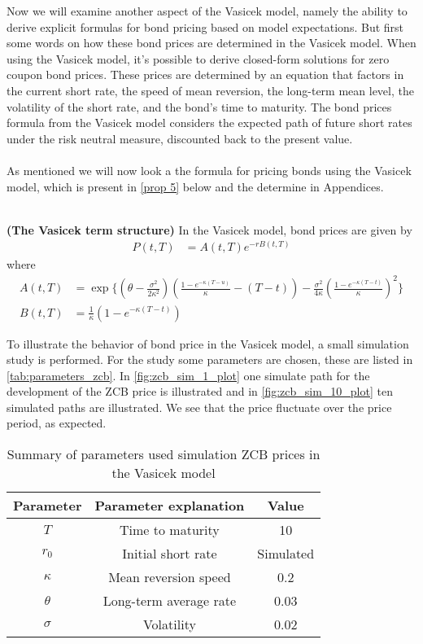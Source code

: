 Now we will examine another aspect of the Vasicek model, namely the ability to derive explicit formulas
for bond pricing based on model expectations.
But first some words on how these bond prices are determined in the Vasicek model. 
When using the Vasicek model, it's possible to derive closed-form solutions for zero coupon bond prices. 
These prices are determined by an equation that factors in the current short rate, the speed of mean reversion,
the long-term mean level, the volatility of the short rate, and the bond’s time to maturity.
The bond prices formula from the Vasicek model considers the expected path of future short 
rates under the risk neutral measure, discounted back to the present value. 
\\\\
As mentioned we will now look a the formula for pricing bonds using the Vasicek model,
which is present in \ref{prop 5} below and the determine in Appendices.
\\\\
\begin{proposition}
    \label{prop 5}
    \textbf{(The Vasicek term structure)} In the Vasicek model, bond prices are given by
 \begin{align*}
    P(t,T) &= A(t,T) e^{-rB(t,T)} 
\end{align*}
where
\begin{align*}
    A(t,T)&= \exp \Biggl\{\left(\theta-\frac{\sigma^2}{2 \kappa^2}\right)\left(\frac{1-e^{-\kappa(T-u)}}{\kappa}-(T-t)\right)
    -\frac{\sigma^2}{4 \kappa}\left(\frac{1-e^{-\kappa(T-t)}}{\kappa}\right)^2 \Biggr\} \\
    B(t,T) & =\frac{1}{\kappa} \left( 1 - e^{-\kappa (T-t)} \right)  
\end{align*}
\cite{Bjork}
\end{proposition}
\noindent
To illustrate the behavior of bond price in the Vasicek model, a small simulation study is performed. For the study 
some parameters are chosen, these are listed in \autoref{tab:parameters_zcb}. In \autoref{fig:zcb_sim_1_plot} one simulate
path for the development of the ZCB price is illustrated and in \autoref{fig:zcb_sim_10_plot} ten simulated paths are illustrated.
We see that the price fluctuate over the price period, as expected.
\\
\begin{table}[H]
    \centering
    \begin{tabular}{ccc}
      \toprule
      \textbf{Parameter} & \textbf{Parameter explanation} & \textbf{Value} \\
      \midrule
      \rowcolor{lightgray!40} $T$ & Time to maturity & 10 \\
      $r_0$ & Initial short rate & Simulated \\
      \rowcolor{lightgray!40} $\kappa$ & Mean reversion speed & 0.2\\
      $\theta$ & Long-term average rate  & 0.03 \\
      \rowcolor{lightgray!40} $\sigma$ & Volatility& 0.02 \\
      \bottomrule
    \end{tabular}
    \caption{Summary of parameters used simulation ZCB prices in the Vasicek model}
    \label{tab:parameters_zcb}
\end{table}
